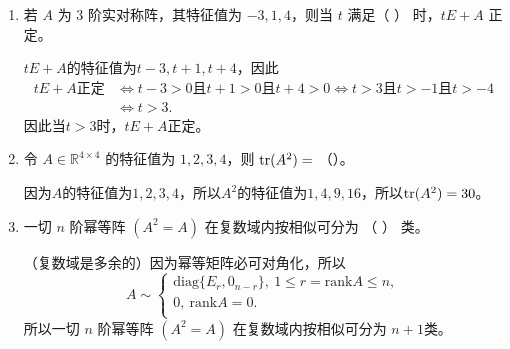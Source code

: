 \begin{enumerate}[1~]
\begin{enumerate}[1.~]
\item
若 $A$ 为 $3$ 阶实对称阵，其特征值为 $-3, 1, 4$，则当 $t$ 满足（ \quad）  时，$tE + A$ 正定。
\begin{solution}
$tE+A$的特征值为$t-3, t+1, t+4$，因此\begin{align*}
tE+A\text{正定}&\Longleftrightarrow t-3>0\text{且}t+1>0\text{且}t+4>0\Longleftrightarrow t>3\text{且}t>-1\text{且}t>-4 \\
&\Longleftrightarrow t>3.
\end{align*}
因此当$t>3$时，$tE+A$正定。
\end{solution}

\item
令 $A\in \mathbb{R}^{4\times 4}$ 的特征值为 $1, 2, 3, 4$，则 ${\rm tr}(A^2) =$ （\quad）。
\begin{solution}
因为$A$的特征值为$1, 2, 3, 4$，所以$A^2$的特征值为$1, 4, 9, 16$，所以${\rm tr}(A^2)=30$。
\end{solution}

\item
一切 $n$ 阶幂等阵 $(A^2 = A)$ 在复数域内按相似可分为 （ \quad） 类。
\begin{solution}
（复数域是多余的）因为幂等矩阵必可对角化，所以\[
A\sim \left\{ \begin{array}{l}
	\text{diag}\{E_r,0_{n-r}\},\ 1\le r=\text{rank}A\le n, \\
	0,\ \text{rank}A=0.\\
\end{array} \right. 
\]
所以一切 $n$ 阶幂等阵 $(A^2 = A)$ 在复数域内按相似可分为 $n+1$类。
\end{solution}

\end{enumerate}


\end{enumerate}
